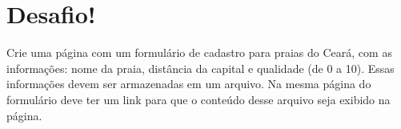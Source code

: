 \section{Desafio!}
\label{cap9-desafio}

Crie uma página com um formulário de cadastro para praias do Ceará, com as informações: nome da praia, 
distância da capital e qualidade (de 0 a 10). Essas informações devem ser armazenadas em um arquivo. Na 
mesma página do formulário deve ter um link para que o conteúdo desse arquivo seja exibido na página.

